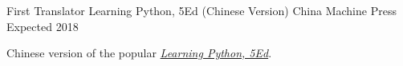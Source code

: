 


\begin{cventries}


\cventry
{First Translator} %
{Learning Python, 5Ed (Chinese Version)} %
{China Machine Press} %
{Expected 2018} %
{ %
\begin{cvitems}
\item {Chinese version of the popular \href{https://www.amazon.com/Learning-Python-5th-Mark-Lutz/dp/1449355730}{\textit{Learning Python, 5Ed}}.}
\end{cvitems}
}


\end{cventries}
